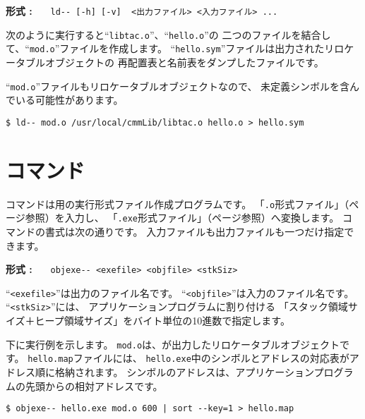 \begin{flushleft}
{\bf 形式 : }~~~\verb/ld-- [-h] [-v]  <出力ファイル> <入力ファイル> .../
\end{flushleft}

次のように実行すると``\verb/libtac.o/''、``\verb/hello.o/''の
二つのファイルを結合して、``\verb/mod.o/''ファイルを作成します。
``\verb/hello.sym/''ファイルは出力されたリロケータブルオブジェクトの
再配置表と名前表をダンプしたファイルです。

``\verb/mod.o/''ファイルもリロケータブルオブジェクトなので、
未定義シンボルを含んでいる可能性があります。

\begin{mylist}
\begin{verbatim}
$ ld-- mod.o /usr/local/cmmLib/libtac.o hello.o > hello.sym
\end{verbatim}
\end{mylist}

\section{{\objexe}コマンド}

{\objexe}コマンドは{\tacos}用の実行形式ファイル作成プログラムです。
「\verb/.o/形式ファイル」（\pageref{app:oformat}ページ参照）を入力し、
「\verb/.exe/形式ファイル」（\pageref{app:eformat}ページ参照）へ変換します。
{\objexe}コマンドの書式は次の通りです。
入力ファイルも出力ファイルも一つだけ指定できます。

\begin{flushleft}
{\bf 形式 : }~~~\verb/objexe-- <exefile> <objfile> <stkSiz>/
\end{flushleft}

``\verb/<exefile>/''は出力のファイル名です。
``\verb/<objfile>/''は入力のファイル名です。
``\verb/<stkSiz>/''には、
アプリケーションプログラムに割り付ける
「スタック領域サイズ＋ヒープ領域サイズ」をバイト単位の10進数で指定します。

下に実行例を示します。
\verb/mod.o/は、\ld が出力したリロケータブルオブジェクトです。
\verb/hello.map/ファイルには、
\verb/hello.exe/中のシンボルとアドレスの対応表がアドレス順に格納されます。
シンボルのアドレスは、アプリケーションプログラムの先頭からの相対アドレスです。

\begin{mylist}
\begin{verbatim}
$ objexe-- hello.exe mod.o 600 | sort --key=1 > hello.map
\end{verbatim}
\end{mylist}

